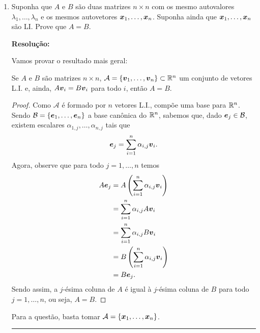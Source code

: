 \documentclass[leqno]{article}
\numberwithin{equation}{section}
\newenvironment{sol} 
{
    \vspace{4mm}
    \noindent\textbf{Resolução:}
    \strut\newline
    \smallskip
    \hspace{-3.5mm} 
} 
{\noindent\rule{4cm}{.1mm}}
\begin{document}
\begin{enumerate}
\begin{sol}
\end{sol}


\item Suponha que $A$ e $B$ são duas matrizes $n \times n$ com os mesmo autovalores $\lambda_1, \ldots, \lambda_n$ e os mesmos autovetores $\boldsymbol{x}_1, \ldots, \boldsymbol{x}_n$. Suponha ainda que $\boldsymbol{x}_1, \ldots, \boldsymbol{x}_n$ são LI. Prove que $A = B$.

\begin{sol}

    Vamos provar o resultado mais geral:
    \begin{prop*}
        Se \( A \) e \( B \) são matrizes \( n \times n \), \( \mathcal{A} = \left\{ \boldsymbol{v}_{ 1 }, \dots, \boldsymbol{v}_{ n } \right\} \subset \mathbb{R}^{ n } \) um conjunto de vetores L.I. e, ainda, \( A \boldsymbol{v}_{ i } = B \boldsymbol{v}_{ i } \) para todo \( i \), então \( A = B \).
    \end{prop*}
    \begin{proof}
        Como \( \mathcal{A} \) é formado por \( n \) vetores L.I., compõe uma base para \( \mathbb{R}^{ n } \).
        Sendo \( \mathcal{B} = \left\{ \boldsymbol{e}_{ 1 }, \dots, \boldsymbol{e}_{ n } \right\} \) a base canônica do \( \mathbb{R}^{ n } \), sabemos que, dado \( \boldsymbol{e}_{ j } \in \mathcal{B} \), existem escalares \( \alpha_{ 1, j }, \dots, \alpha_{ n, j } \) tais que
        \begin{equation*}
            \boldsymbol{e}_{ j } = \sum_{ i=1 }^{ n } \alpha_{ i, j } \boldsymbol{v}_{ i }
        .\end{equation*}
        Agora, observe que para todo \( j = 1, \dots, n \) temos
        \begin{align*}
            A \boldsymbol{e}_{ j } &=
            A \left(
                \sum_{ i=1 }^{ n } \alpha_{ i, j } \boldsymbol{v}_{ i }
            \right) \\
                         &= \sum_{ i=1 }^{ n } \alpha_{ i, j } A \boldsymbol{v}_{ i } \\
                         &= \sum_{ i=1 }^{ n } \alpha_{ i, j } B \boldsymbol{v}_{ i } \\
                         &= B \left(
                             \sum_{ i=1 }^{ n } \alpha_{ i, j } \boldsymbol{v}_{ i }
                         \right) \\
                         &= B \boldsymbol{e}_{ j }
        .\end{align*}
        Sendo assim, a \( j \)-ésima coluna de \( A \) é igual à \( j \)-ésima coluna de \( B \) para todo \( j = 1, \dots, n \), ou seja, \( A = B \).
    \end{proof}
    Para a questão, basta tomar \( \mathcal{A} = \left\{ \boldsymbol{x}_{ 1 }, \dots, \boldsymbol{x}_{ n } \right\} \).
    

\end{sol}
\end{enumerate}
\end{document}
